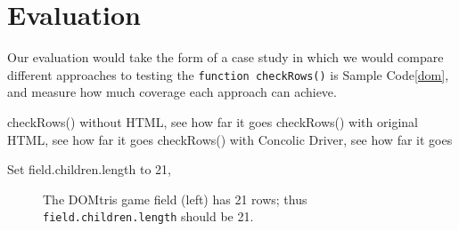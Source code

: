 \section{Evaluation}
Our evaluation would take the form of a case study in which we would compare different approaches to testing the {\tt function checkRows()} is Sample Code\ref{dom}, and measure how much coverage each approach can achieve.

 

checkRows() without HTML, see how far it goes
checkRows() with original HTML, see how far it goes
checkRows() with Concolic Driver, see how far it goes

Set field.children.length to 21, 

\begin{figure}%
\centerline{}
\caption[DOMtris game field]{The DOMtris game field (left) has 21 rows; thus {\tt field.children.length} should be 21.}
\label{trees}
\end{figure}


